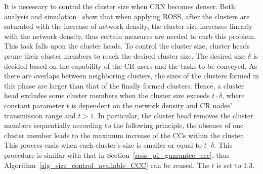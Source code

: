 \documentclass[10pt,journal,compsoc]{IEEEtran}
\theoremstyle{mytheoremstyle}
\theoremstyle{mytheoremstyle}
\theoremstyle{mytheoremstyle}
\begin{document}
%
It is necessary to control the cluster size when CRN becomes denser.
Both analysis and simulation~\cite{robust_clustering_arxiv} show that when applying ROSS, after the clusters are saturated with the increase of network density, the cluster size increases linearly with the network density, thus certain measures are needed to curb this problem.
This task falls upon the cluster heads.
To control the cluster size, cluster heads prune their cluster members to reach the desired cluster size.
The desired size $\delta$ is decided based on the capability of the CR users and the tasks to be conveyed.
As there are overlaps between neighboring clusters, the sizes of the clusters formed in this phase are larger than that of the finally formed clusters.
Hence, a cluster head excludes some cluster members when the cluster size exceeds $t\cdot \delta$, where constant parameter $t$ is dependent on the network density and CR nodes' transmission range and $t>1$.
In particular, the cluster head removes the cluster members sequentially according to the following principle, the absence of one cluster member leads to the maximum increase of the CCs within the cluster.
This process ends when each cluster's size is smaller or equal to $t \cdot\delta$.
This procedure is similar with that in Section~\ref{ross_p1_guarantee_ccc}, thus Algorithm~\ref{alg_size_control_available_CCC} can be reused.
The $t$ is set to 1.3. 	
\end{document}
